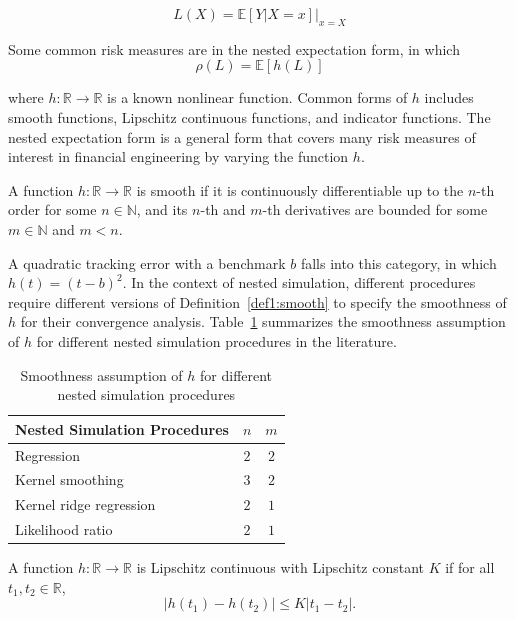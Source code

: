 $$ L(X) = \mathbb{E}\left[ Y|X=x \right]\vert_{x=X} $$

Some common risk measures are in the nested expectation form, in which 
$$\rho(L) = \mathbb{E}\left[ h(L) \right]$$

where $h: \mathbb{R} \rightarrow \mathbb{R}$ is a known nonlinear function. 
Common forms of $h$ includes smooth functions, Lipschitz continuous functions, and indicator functions.
The nested expectation form is a general form that covers many risk measures of interest in financial engineering by varying the function $h$.

\begin{definition} \label{def1:smooth}
    A function $h: \mathbb{R} \rightarrow \mathbb{R}$ is smooth if it is continuously differentiable up to the $n$-th order for some $n \in \mathbb{N}$, 
    and its $n$-th and $m$-th derivatives are bounded for some $m \in \mathbb{N}$ and $m < n$.
\end{definition}

A quadratic tracking error with a benchmark $b$ falls into this category, in which $h(t) = (t - b)^2$.
In the context of nested simulation, different procedures require different versions of Definition~\ref{def1:smooth} to specify the smoothness of $h$ for their convergence analysis.
Table~\ref{tab1:smoothness} summarizes the smoothness assumption of $h$ for different nested simulation procedures in the literature.

\begin{table}[ht!]
    \centering
    \begin{tabular}{lcc}
    \toprule
    \textbf{Nested Simulation Procedures} & $n$ & $m$ \\
    \midrule
    Regression & $2$ & $2$ \\
    Kernel smoothing & $3$ & $2$ \\
    Kernel ridge regression & $2$ & $1$ \\
    Likelihood ratio & $2$ & $1$ \\
    \bottomrule
    \end{tabular}
    \caption{Smoothness assumption of $h$ for different nested simulation procedures}
    \label{tab1:smoothness}
\end{table}

\begin{definition} \label{def1:lipschitz}
    A function $h: \mathbb{R} \rightarrow \mathbb{R}$ is Lipschitz continuous with Lipschitz constant $K$ if for all $t_1, t_2 \in \mathbb{R}$, 
    $$|h(t_1) - h(t_2)| \leq K|t_1 - t_2|.$$
\end{definition}


